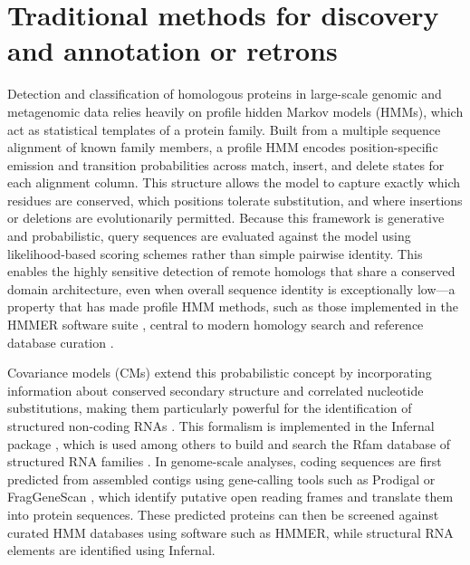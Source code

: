 \section{Traditional methods for discovery and annotation or retrons} 


Detection and classification of homologous proteins in large-scale genomic and metagenomic data relies heavily on profile hidden Markov models (HMMs), which act as statistical templates of a protein family. Built from a multiple sequence alignment of known family members, a profile HMM encodes position-specific emission and transition probabilities across match, insert, and delete states for each alignment column. This structure allows the model to capture exactly which residues are conserved, which positions tolerate substitution, and where insertions or deletions are evolutionarily permitted. Because this framework is generative and probabilistic, query sequences are evaluated against the model using likelihood-based scoring schemes rather than simple pairwise identity. This enables the highly sensitive detection of remote homologs that share a conserved domain architecture, even when overall sequence identity is exceptionally low—a property that has made profile HMM methods, such as those implemented in the HMMER software suite \cite{krogh1994hmm, eddy2011hmmer}, central to modern homology search and reference database curation \cite{mistry2021pfam}.

Covariance models (CMs) extend this probabilistic concept by incorporating information about conserved secondary structure and correlated nucleotide substitutions, making them particularly powerful for the identification of structured non-coding RNAs \cite{eddy1994covariance, durbin1998biological}. This formalism is implemented in the Infernal package \cite{nawrocki2013infernal}, which is used among others to build and search the Rfam database of structured RNA families \cite{kalvari2021rfam}. In genome-scale analyses, coding sequences are first predicted from assembled contigs using gene-calling tools such as Prodigal \cite{hyatt2010prodigal} or FragGeneScan \cite{rho2010fraggenescan}, which identify putative open reading frames and translate them into protein sequences. These predicted proteins can then be screened against curated HMM databases using software such as HMMER, while structural RNA elements are identified using Infernal. 

